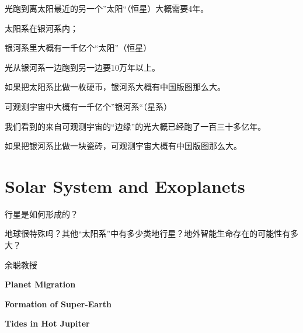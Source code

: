 \documentclass[CJK]{beamer}
\begin{document}
\begin{frame}
  \bch
 \bcenter 
 光跑到离太阳最近的另一个”太阳“（恒星）大概需要4年。
  \ecenter
  \ech
\end{frame}


\begin{frame}
  \bch
  \emini
  太阳系在银河系内；
  
  银河系里大概有一千亿个“太阳”（恒星）

  \skipline
  
  光从银河系一边跑到另一边要10万年以上。
  \emini

  {\scriptsize 如果把太阳系比做一枚硬币，银河系大概有中国版图那么大。}

  \ech
\end{frame}


\begin{frame}
  \bch
  \emini
  可观测宇宙中大概有一千亿个”银河系“（星系）

  \skipline
  
  我们看到的来自可观测宇宙的“边缘”的光大概已经跑了一百三十多亿年。
  \emini

  {\scriptsize 如果把银河系比做一块瓷砖，可观测宇宙大概有中国版图那么大。}
  
  \ech
\end{frame}


\section{Solar System and Exoplanets}



\begin{frame}
  \bch
  
  \ech
\end{frame}
  
\begin{frame}
  \bch
  \bitem
\item{行星是如何形成的？}  
\item{地球很特殊吗？其他“太阳系”中有多少类地行星？地外智能生命存在的可能性有多大？}
  \eitem

  \skipline
  
  \bcenter
  余聪教授


  \ecenter
  
  \emini
  \bitem
\item{{\bf Planet Migration}}
\item{{\bf Formation of Super-Earth}}
\item{{\bf Tides in Hot Jupiter}}
  \eitem
  \emini
  \ech
\end{frame}
\end{document}
